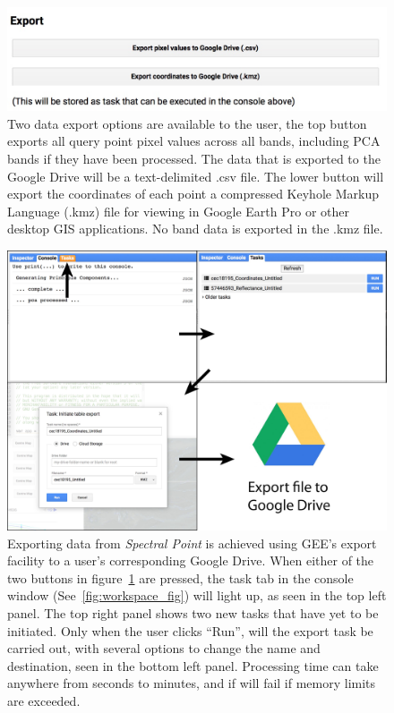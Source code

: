 \documentclass[12pt]{article}
\begin{document}
\begin{figure}[htbp]
\centering
\includegraphics[width=1.0\textwidth]{images/export.jpeg}
\caption{Two data export options are available to the user, the top button exports all query point pixel  values across all bands, including PCA bands if they have been processed. The data that is exported to the Google Drive will be a text-delimited .csv file. The lower button will export the coordinates of each point a compressed Keyhole Markup Language (.kmz) file for viewing in Google Earth Pro or other desktop GIS applications. No band data is exported in the .kmz file.}
\label{fig:export}
\end{figure}

\begin{figure}[htbp]
\centering
\includegraphics[width=1.0\textwidth]{images/export_task_reduced.jpg}
\caption{Exporting data from \textit{Spectral Point} is achieved using GEE's export facility to a user's corresponding Google Drive. When either of the two buttons in figure~\ref{fig:export} are pressed, the task tab in the console window (See~\ref{fig:workspace_fig}) will light up, as seen in the top left panel. The top right panel shows two new tasks that have yet to be initiated. Only when the user clicks ``Run'', will the export task be carried out, with several options to change the name and destination, seen in the bottom left panel. Processing time can take anywhere from seconds to minutes, and if will fail if memory limits are exceeded.}
\label{fig:export_task}
\end{figure}
\end{document}
